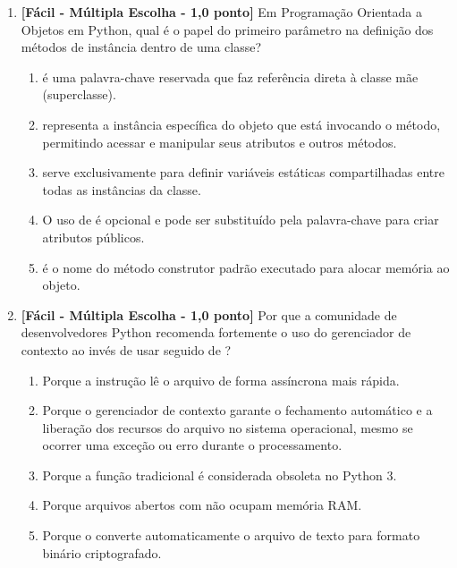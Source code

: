 \begin{enumerate}[label=\textbf{Q\arabic*.}, start=64]

\item \textbf{[Fácil - Múltipla Escolha - 1,0 ponto]} Em Programação Orientada a Objetos em Python, qual é o papel do primeiro parâmetro  na definição dos métodos de instância dentro de uma classe?

\begin{enumerate}[label=\textbf{(\Alph*)}]
    \item {} é uma palavra-chave reservada que faz referência direta à classe mãe (superclasse).
    \item {} representa a instância específica do objeto que está invocando o método, permitindo acessar e manipular seus atributos e outros métodos.
    \item {} serve exclusivamente para definir variáveis estáticas compartilhadas entre todas as instâncias da classe.
    \item O uso de  é opcional e pode ser substituído pela palavra-chave  para criar atributos públicos.
    \item {} é o nome do método construtor padrão executado para alocar memória ao objeto.
\end{enumerate}



\vspace{0.4cm}

\item \textbf{[Fácil - Múltipla Escolha - 1,0 ponto]} Por que a comunidade de desenvolvedores Python recomenda fortemente o uso do gerenciador de contexto  ao invés de usar  seguido de ?

\begin{enumerate}[label=\textbf{(\Alph*)}]
    \item Porque a instrução  lê o arquivo de forma assíncrona mais rápida.
    \item Porque o gerenciador de contexto  garante o fechamento automático e a liberação dos recursos do arquivo no sistema operacional, mesmo se ocorrer uma exceção ou erro durante o processamento.
    \item Porque a função  tradicional é considerada obsoleta no Python 3.
    \item Porque arquivos abertos com  não ocupam memória RAM.
    \item Porque o  converte automaticamente o arquivo de texto para formato binário criptografado.
\end{enumerate}


\end{enumerate}
